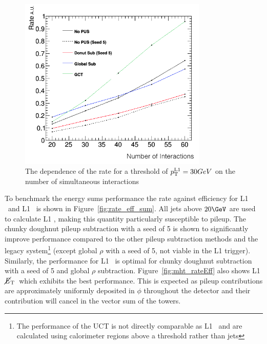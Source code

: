 \begin{figure}
\centering
    \includegraphics[width=0.8\textwidth]{./Figures/triggerUpgrade/neutrinonvtx_jet1}
  \caption{The dependence of the rate for a threshold of ${p_{\text T}^{\text{L1}}}=30GeV$ on the number of simultaneous interactions}
  \label{fig:rate_nvtx}
\end{figure}

To benchmark the energy sums performance the rate against efficiency for L1 \scalht~and L1 \mht~is shown in Figure~\ref{fig:rate_eff_sum}.
All jets above $20\GeV$ are used to calculate L1 \scalht, making this quantity particularly susceptible to pileup. The chunky doughnut 
pileup subtraction with a seed of 5 is shown to significantly improve performance compared to the other pileup subtraction
methods and the legacy system\footnote{The performance of the UCT is not 
directly comparable as L1 \scalht~and \mht are calculated using calorimeter regions above a threshold
rather than jets} (except global $\rho$ with a seed of 5, not viable in the L1 trigger). Similarly, the performance for 
L1 \mht~is optimal for chunky doughnut subtraction with a seed of 5 and global $\rho$ subtraction. 
Figure~\ref{fig:mht_rateEff} also shows L1 $\mbox{$\cancel{E}_\text{T}$}$~which exhibits the best performance. This is expected as 
pileup contributions are approximately uniformly deposited in $\phi$ throughout the detector and their contribution will
cancel in the vector sum of the towers.

